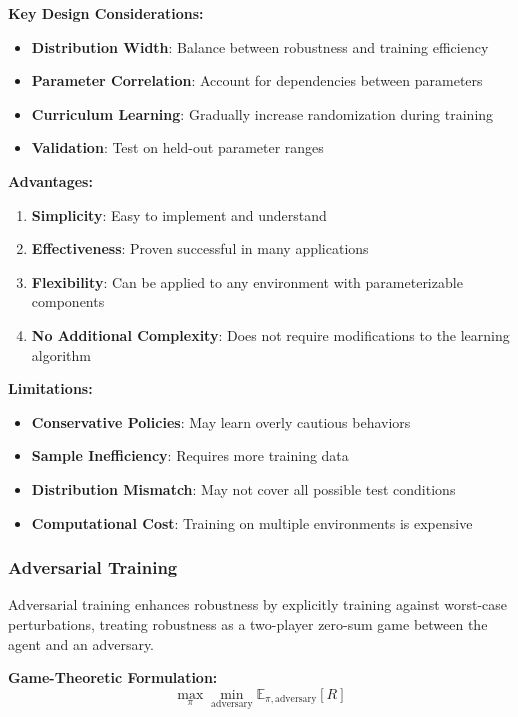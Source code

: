 \documentclass[12pt]{article}
\begin{document}
{{{{\textbf{Key Design Considerations:}
\begin{itemize}
\item \textbf{Distribution Width}: Balance between robustness and training efficiency
\item \textbf{Parameter Correlation}: Account for dependencies between parameters
\item \textbf{Curriculum Learning}: Gradually increase randomization during training
\item \textbf{Validation}: Test on held-out parameter ranges
\end{itemize}

\textbf{Advantages:}
\begin{enumerate}
\item \textbf{Simplicity}: Easy to implement and understand
\item \textbf{Effectiveness}: Proven successful in many applications
\item \textbf{Flexibility}: Can be applied to any environment with parameterizable components
\item \textbf{No Additional Complexity}: Does not require modifications to the learning algorithm
\end{enumerate}

\textbf{Limitations:}
\begin{itemize}
\item \textbf{Conservative Policies}: May learn overly cautious behaviors
\item \textbf{Sample Inefficiency}: Requires more training data
\item \textbf{Distribution Mismatch}: May not cover all possible test conditions
\item \textbf{Computational Cost}: Training on multiple environments is expensive
\end{itemize}

\subsubsection{Adversarial Training}

Adversarial training enhances robustness by explicitly training against worst-case perturbations, treating robustness as a two-player zero-sum game between the agent and an adversary.

\textbf{Game-Theoretic Formulation:}
\begin{equation}
\max_\pi \min_{\text{adversary}} \mathbb{E}_{\pi, \text{adversary}}[R]
\end{equation}

}}}}
\end{document}
